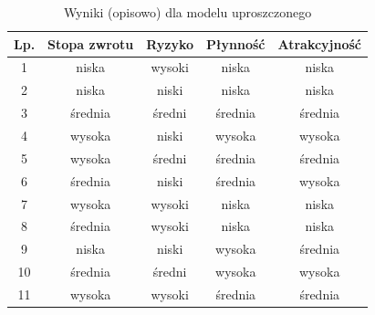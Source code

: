 \begin{table}[h]
\centering
\caption{Wyniki (opisowo) dla modelu uproszczonego}
\label{tab:results_desc}
\begin{tabular}{ccccc}
\toprule
Lp. & Stopa zwrotu & Ryzyko & Płynność & Atrakcyjność \\ 
\midrule
1 & niska & wysoki & niska & niska \\ 
2 & niska & niski & niska & niska \\ 
3 & średnia & średni & średnia & średnia \\ 
4 & wysoka & niski & wysoka & wysoka \\ 
5 & wysoka & średni & średnia & średnia \\ 
6 & średnia & niski & średnia & wysoka \\ 
7 & wysoka & wysoki & niska & niska \\ 
8 & średnia & wysoki & niska & niska \\ 
9 & niska & niski & wysoka & średnia \\ 
10 & średnia & średni & wysoka & wysoka \\ 
11 & wysoka & wysoki & średnia & średnia \\ 
\bottomrule
\end{tabular}
\end{table}
